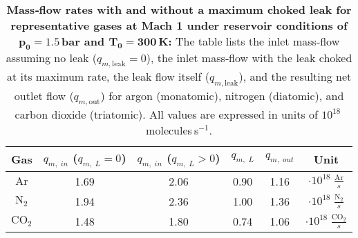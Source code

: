 \begin{table}[ht]
  \centering
  \renewcommand{\arraystretch}{1.4} %
  \begin{tabular}{|c||c||c|c|c||c|}
    \hline
    Gas & $q_{m,\;in}$ ($q_{m,\;L} = 0$) & $q_{m,\;in}$ ($q_{m,\;L} > 0$) & $q_{m,\;L}$ & $q_{m,\;out}$ & Unit\\ \hline \hline
    $\text{Ar}$ & 1.69 & 2.06 & 0.90 & 1.16 & $\cdot 10^{18} \; \frac{\text{Ar}}{s}$ \\ \hline
    $\text{N}_2$ & 1.94 & 2.36 & 1.00 & 1.36 & $\cdot 10^{18}\; \frac{\text{N}_2}{s}$ \\ \hline
    $\text{CO}_2$ & 1.48 & 1.80 & 0.74 & 1.06 & $\cdot 10^{18}\; \frac{\text{CO}_2}{s}$ \\ \hline
  \end{tabular}
   \caption[Mass‐flow rates with and without a choked leak for representative gases at Mach 1 under reservoir conditions of $p_0=1.5$\,bar and $T_0=300$\,K]{%
    \textbf{Mass‐flow rates with and without a maximum choked leak for representative gases at Mach 1 under reservoir conditions of $\mathbf{p_0=1.5}$\,bar and $\mathbf{T_0=300}$\,K:}  
    The table lists the inlet mass‐flow assuming no leak ($q_{m,\text{leak}}=0$), the inlet mass‐flow with the leak choked at its maximum rate, the leak flow itself ($q_{m,\text{leak}}$), and the resulting net outlet flow ($q_{m,\text{out}}$) for argon (monatomic), nitrogen (diatomic), and carbon dioxide (triatomic). All values are expressed in units of $10^{18}$ molecules s$^{-1}$.  
  }
  \label{tab:massflow_discussion}
\end{table}
